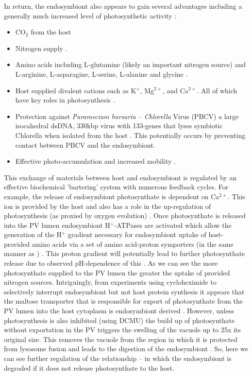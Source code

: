In return, the endosymbiont also appears to gain several advantages including a generally much increased level of photosynthetic activity \citep{Sommaruga2009}:
\begin{itemize}
    \item CO$_{2}$ from the host \citep{Parker1926}
    \item Nitrogen supply \citep{Johnson2011}.
    \item Amino acids including L-glutamine (likely an important nitrogen source) and L-arginine, L-asparagine, L-serine, L-alanine and glycine \citep{Kato2009a}.
    \item Host supplied divalent cations such as K$^{+}$, Mg$^{2+}$, and Ca$^{2+}$. All of which have key roles in photosynthesis \citep{Kato2009a}.
    \item Protection against \textit{Paramecium bursaria – Chlorella} Virus (PBCV) \citep{Yashchenko2012} a large isocahedral dsDNA, 330kbp virus with 133-genes that lyses symbiotic Chlorella when isolated from the host \citep{VanEtten1983}.  This potentially occurs by preventing contact between PBCV and the endosymbiont.
    \item Effective photo-accumulation and increased mobility \citep{Niess1982}.
\end{itemize}
%
This exchange of materials between host and endosymbiont is regulated by an effective biochemical 'bartering' system with numerous feedback cycles. 
For example, the release of endosymbiont photosynthate is dependent on Ca$^{2+}$.  
This ion is provided by the host and also has a role in the up-regulation of photosynthesis (as proxied by oxygen evolution) \citep{Kato2009a}.     
Once photosynthate is released into the PV lumen endosymbiont H$^{+}$-ATPases are activated which allow the generation of the H$^{+}$ gradient necessary for endosymbiont uptake of host-provided amino acids via a set of amino acid-proton symporters (in the same manner as \citep{Camoni2006}) \citep{Kato2009a}.
This proton gradient will potentially lead to further photosynthate release due to observed pH-dependence of this \citep{Kato2009a}. 
As we can see the more photosynthate supplied to the PV lumen the greater the uptake of provided nitrogen sources.  
Intriguingly, from experiments using cycloheximide to selectively interrupt endosymbiont but not host protein synthesis it appears that the maltose transporter that is responsible for export of photosynthate from the PV lumen into the host cytoplasm is endosymbiont derived \citep{Muscatine1967}. 
However, unless photosynthesis is also inhibited (using DCMU) the build up of photosynthate without exportation in the PV triggers the swelling of the vacuole up to 25x its original size.  
This removes the vacuole from the region in which it is protected from lysosome fusion and leads to the digestion of the endosymbiont \citep{Kodama2009a}.
So, here we can see further regulation of the relationship – in which the endosymbiont is degraded if it does not release photosynthate to the host.

